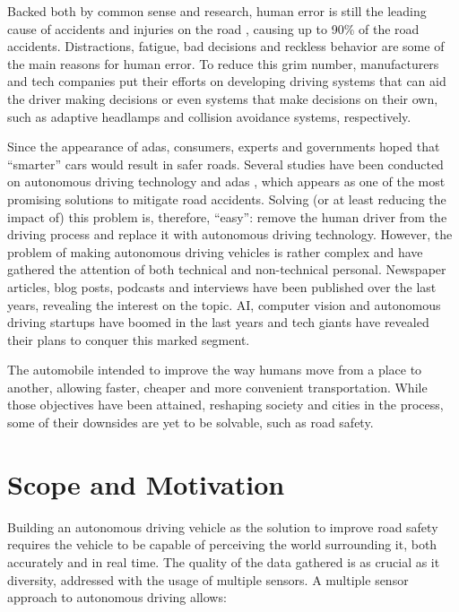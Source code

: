 Backed both by common sense and research, human error is still the leading cause of accidents and injuries on the road \cite{Bimbraw2015, WHO2018}, causing up to 90\% of the road accidents. Distractions, fatigue, bad decisions and reckless behavior are some of the main reasons for human error. To reduce this grim number, manufacturers and tech companies put their efforts on developing driving systems that can aid the driver making decisions or even systems that make decisions on their own, such as adaptive headlamps and collision avoidance systems, respectively.

Since the appearance of \ac{adas}, consumers, experts and governments hoped that ``smarter'' cars would result in safer roads. Several studies have been conducted on autonomous driving technology and \ac{adas} \cite{Fridman2017, ADAS1, Bimbraw2015}, which appears as one of the most promising solutions to mitigate road accidents. Solving (or at least reducing the impact of) this problem is, therefore, ``easy'': remove the human driver from the driving process and replace it with autonomous driving technology. However, the problem of making autonomous driving vehicles  is rather complex and have gathered the attention of both technical and non-technical personal. Newspaper articles, blog posts, podcasts and interviews have been published over the last years, revealing the interest on the topic. \ac{AI}, computer vision and autonomous driving startups have boomed in the last years and tech giants have revealed their plans to conquer this marked segment.

The automobile intended to improve the way humans move from a place to another, allowing faster, cheaper and more convenient transportation. While those objectives have been attained, reshaping society and cities in the process, some of their downsides are yet to be solvable, such as road safety.


\section{Scope and Motivation}
\label{sec:introduction:scope_motivation}
Building an autonomous driving vehicle as the solution to improve road safety requires the vehicle to be capable of perceiving the world surrounding it, both accurately and in real time. The quality of the data gathered is as crucial as it diversity, addressed with the usage of multiple sensors. A multiple sensor approach to autonomous driving allows:

